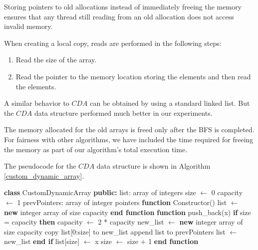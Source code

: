 Storing pointers to old allocations instead of immediately freeing the memory ensures that any thread still reading from an old allocation does not access invalid memory.

When creating a local copy, reads are performed in the following steps:
\begin{enumerate}
    \item Read the size of the array.
    \item Read the pointer to the memory location storing the elements and then read the elements.
\end{enumerate}

A similar behavior to $CDA$ can be obtained by using a standard linked list. But the $CDA$ data structure performed much better in our experiments.

The memory allocated for the old arrays is freed only after the BFS is completed. For fairness with other algorithms, we have included the time required for freeing the memory as part of our algorithm's total execution time. 

The pseudocode for the $CDA$ data structure is shown in Algorithm \ref{custom_dynamic_array}.

\begin{algorithm}
\caption{Class Definition: CustomDynamicArray}
\label{custom_dynamic_array}
\begin{algorithmic}[1]
\State \textbf{class} CustomDynamicArray
\State \quad \textbf{public:}
\State \quad \quad list: array of integers
\State \quad \quad size $\gets$ 0
\State \quad \quad capacity $\gets$ 1
\State \quad \quad prevPointers: array of integer pointers
\State \quad \quad 
\State \quad \quad \textbf{function} Constructor()
\State \quad \quad \quad list $\gets$ \textbf{new} integer array of size capacity
\State \quad \quad \textbf{end function}
\State \quad \quad 
\State \quad \quad \textbf{function} push\_back(x)
\State \quad \quad \quad \textbf{if} size = capacity \textbf{then}
\State \quad \quad \quad \quad capacity $\gets$ 2 * capacity
\State \quad \quad \quad \quad new\_list $\gets$ \textbf{new} integer array of size capacity
\State \quad \quad \quad \quad copy list[0:size] to new\_list
\State \quad \quad \quad \quad append list to prevPointers
\State \quad \quad \quad \quad list $\gets$ new\_list
\State \quad \quad \quad \textbf{end if}
\State \quad \quad \quad list[size] $\gets$ x
\State \quad \quad \quad size $\gets$ size + 1
\State \quad \quad \textbf{end function}
\end{algorithmic}
\end{algorithm}

